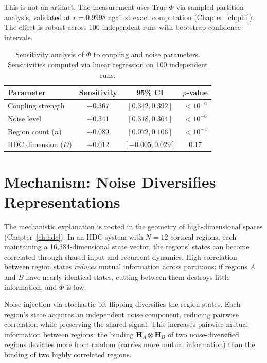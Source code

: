 \documentclass[12pt]{book}
\newcommand{\bind}{\otimes}
\begin{document}
This is not an artifact. The measurement uses True $\Phi$ via sampled partition analysis, validated at $r = 0.9998$ against exact computation (Chapter~\ref{ch:phi}). The effect is robust across 100 independent runs with bootstrap confidence intervals.

\begin{table}[H]
\centering
\caption{Sensitivity analysis of $\Phi$ to coupling and noise parameters. Sensitivities computed via linear regression on 100 independent runs.}
\label{tab:sensitivity}
\begin{tabular}{lccc}
\toprule
\textbf{Parameter} & \textbf{Sensitivity} & \textbf{95\% CI} & \textbf{$p$-value} \\
\midrule
Coupling strength & $+0.367$ & $[0.342, 0.392]$ & $< 10^{-6}$ \\
Noise level & $+0.341$ & $[0.318, 0.364]$ & $< 10^{-6}$ \\
Region count ($n$) & $+0.089$ & $[0.072, 0.106]$ & $< 10^{-4}$ \\
HDC dimension ($D$) & $+0.012$ & $[-0.005, 0.029]$ & $0.17$ \\
\bottomrule
\end{tabular}
\end{table}

\section{Mechanism: Noise Diversifies Representations}

The mechanistic explanation is rooted in the geometry of high-dimensional spaces (Chapter~\ref{ch:hdc}). In an HDC system with $N = 12$ cortical regions, each maintaining a 16,384-dimensional state vector, the regions' states can become correlated through shared input and recurrent dynamics. High correlation between region states \textit{reduces} mutual information across partitions: if regions $A$ and $B$ have nearly identical states, cutting between them destroys little information, and $\Phi$ is low.

Noise injection via stochastic bit-flipping diversifies the region states. Each region's state acquires an independent noise component, reducing pairwise correlation while preserving the shared signal. This increases pairwise mutual information between regions: the binding $\mathbf{H}_A \bind \mathbf{H}_B$ of two noise-diversified regions deviates more from random (carries more mutual information) than the binding of two highly correlated regions.
\end{document}
